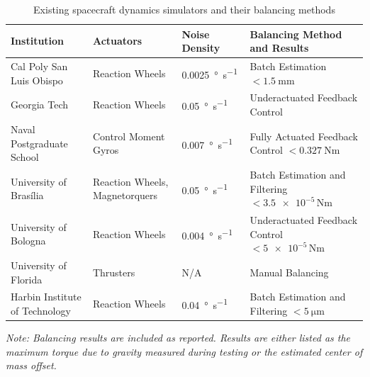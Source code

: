 \begin{table}[!ht]
\caption{Existing spacecraft dynamics simulators and their balancing methods}\label{table:existing_testbeds}
\centering
\renewcommand{\arraystretch}{1.3}

\begin{tabularx}{\textwidth}{
    >{\raggedright\arraybackslash}p{3cm}   %
    >{\raggedright\arraybackslash}p{3.5cm} %
    >{\raggedright\arraybackslash}p{2.2cm} %
    >{\raggedright\arraybackslash}X}       %
\toprule
\textbf{Institution} & \textbf{Actuators} & \textbf{Noise Density} & \textbf{Balancing Method and Results} \\
\midrule
Cal Poly San Luis Obispo~\cite{dam_applied_2014} & 
Reaction Wheels & 
\SI{0.0025}{\degree\per\second} & 
Batch Estimation \newline $<\SI{1.5}{\milli\metre}$ \\
\addlinespace[0.75em]

Georgia Tech~\cite{choi_automatic_2016} & 
Reaction Wheels & 
\SI{0.05}{\degree\per\second} & 
Underactuated Feedback Control \\
\addlinespace[0.75em]
Naval Postgraduate School~\cite{kim_system_2006} & 
Control Moment Gyros & 
\SI{0.007}{\degree\per\second} & 
Fully Actuated Feedback Control \newline $<\SI{0.327}{\newton\metre}$ \\
\addlinespace[0.75em]
University of Brasília~\cite{silva_filtering_2018} & 
Reaction Wheels, Magnetorquers & 
\SI{0.05}{\degree\per\second} & 
Batch Estimation and Filtering \newline $<\num{3.5e-5}\,\si{\newton\metre}$ \\
\addlinespace[0.75em]
University of Bologna~\cite{modenini2020dynamic} & 
Reaction Wheels & 
\SI{0.004}{\degree\per\second} & 
Underactuated Feedback Control \newline $<\num{5e-5}\,\si{\newton\metre}$ \\
\addlinespace[0.75em]
University of Florida~\cite{saulnier2014six} & 
Thrusters & 
N/A & 
Manual Balancing \\
\addlinespace[0.75em]
Harbin Institute of Technology~\cite{xu_parameter_2015} & 
Reaction Wheels & 
\SI{0.04}{\degree\per\second} & 
Batch Estimation and Filtering \newline $<\SI{5}{\micro\metre}$ \\
\bottomrule
\end{tabularx}

\vspace{0.5em}
\raggedright\footnotesize
\textit{Note: Balancing results are included as reported. Results are either listed as the maximum torque due to gravity measured during testing or the estimated center of mass offset.}
\end{table}

